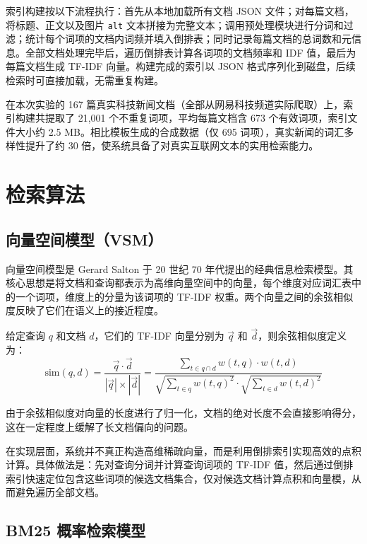 \documentclass[12pt, a4paper]{ctexart}
\begin{document}
索引构建按以下流程执行：首先从本地加载所有文档 JSON 文件；对每篇文档，将标题、正文以及图片 \texttt{alt} 文本拼接为完整文本；调用预处理模块进行分词和过滤；统计每个词项的文档内词频并填入倒排表；同时记录每篇文档的总词数和元信息。全部文档处理完毕后，遍历倒排表计算各词项的文档频率和 IDF 值，最后为每篇文档生成 TF-IDF 向量。构建完成的索引以 JSON 格式序列化到磁盘，后续检索时可直接加载，无需重复构建。

在本次实验的 167 篇真实科技新闻文档（全部从网易科技频道实际爬取）上，索引构建共提取了 21,001 个不重复词项，平均每篇文档含 673 个有效词项，索引文件大小约 2.5 MB。相比模板生成的合成数据（仅 695 词项），真实新闻的词汇多样性提升了约 30 倍，使系统具备了对真实互联网文本的实用检索能力。


\section{检索算法}

\subsection{向量空间模型（VSM）}

向量空间模型是 Gerard Salton 于 20 世纪 70 年代提出的经典信息检索模型。其核心思想是将文档和查询都表示为高维向量空间中的向量，每个维度对应词汇表中的一个词项，维度上的分量为该词项的 TF-IDF 权重。两个向量之间的余弦相似度反映了它们在语义上的接近程度。

给定查询 $q$ 和文档 $d$，它们的 TF-IDF 向量分别为 $\vec{q}$ 和 $\vec{d}$，则余弦相似度定义为：
\begin{equation}
    \text{sim}(q, d) = \frac{\vec{q} \cdot \vec{d}}{|\vec{q}| \times |\vec{d}|}
    = \frac{\displaystyle\sum_{t \in q \cap d} w(t, q) \cdot w(t, d)}
           {\sqrt{\displaystyle\sum_{t \in q} w(t, q)^2} \cdot \sqrt{\displaystyle\sum_{t \in d} w(t, d)^2}}
\end{equation}

由于余弦相似度对向量的长度进行了归一化，文档的绝对长度不会直接影响得分，这在一定程度上缓解了长文档偏向的问题。

在实现层面，系统并不真正构造高维稀疏向量，而是利用倒排索引实现高效的点积计算。具体做法是：先对查询分词并计算查询词项的 TF-IDF 值，然后通过倒排索引快速定位包含这些词项的候选文档集合，仅对候选文档计算点积和向量模，从而避免遍历全部文档。

\subsection{BM25 概率检索模型}
\end{document}
